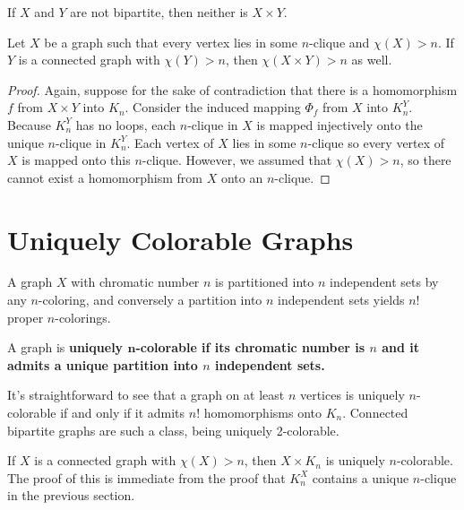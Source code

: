 \begin{corollary}
	If $X$ and $Y$ are not bipartite, then neither is $X\times Y$.
\end{corollary}

\begin{corollary}
	Let $X$ be a graph such that every vertex lies in some $n$-clique and $\chi(X)>n$.  If $Y$ is a connected graph with $\chi(Y)>n$, then $\chi(X\times Y)>n$ as well.
\end{corollary}

\begin{proof}
	Again, suppose for the sake of contradiction that there is a homomorphism $f$ from $X\times Y$ into $K_n$.  Consider the induced mapping $\Phi_f$ from $X$ into $K_n^Y$.  Because $K_n^Y$ has no loops, each $n$-clique in $X$ is mapped injectively onto the unique $n$-clique in $K_n^Y$.  Each vertex of $X$ lies in some $n$-clique so every vertex of $X$ is mapped onto this $n$-clique.  However, we assumed that $\chi(X)>n$, so there cannot exist a homomorphism from $X$ onto an $n$-clique.
\end{proof}



\section*{Uniquely Colorable Graphs}

A graph $X$ with chromatic number $n$ is partitioned into $n$ independent sets by any $n$-coloring, and conversely a partition into $n$ independent sets yields $n!$ proper $n$-colorings.  

\begin{definition}
	A graph is \textbf{uniquely $\boldsymbol{n}$-colorable if its chromatic number is $n$ and it admits a unique partition into $n$ independent sets.}
\end{definition}

It's straightforward to see that a graph on at least $n$ vertices is uniquely $n$-colorable if and only if it admits $n!$ homomorphisms onto $K_n$.  Connected bipartite graphs are such a class, being uniquely 2-colorable.

\begin{theorem}
	{If $X$ is a connected graph with $\chi(X)>n$, then $X\times K_n$ is uniquely $n$-colorable.}  The proof of this is immediate from the proof that $K^X_n$ contains a unique $n$-clique in the previous section.
\end{theorem}

